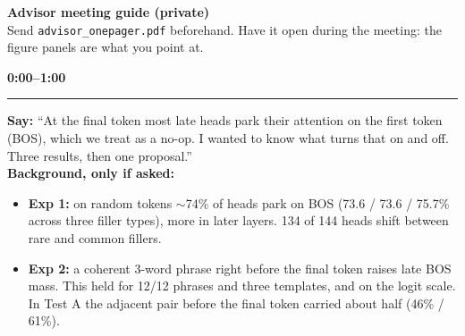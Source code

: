 \documentclass[10pt]{article}
\newcommand{\stage}[2]{\par\vspace{6pt}{\large\bfseries\color{cblue}#1}\hfill{\large\bfseries #2}\\[-4pt]\rule{\linewidth}{0.6pt}\par}
\newcommand{\lab}[1]{\textbf{\color{ink2}#1}}
\begin{document}
\small

{\Large\bfseries Advisor meeting guide (private)}\\
{\footnotesize\color{muted} Send \texttt{advisor\_onepager.pdf} beforehand. Have it open during the meeting: the figure panels  are what you point at.}

\vspace{4pt}

\stage{Framing}{0:00--1:00}
\lab{Say:} ``At the final token most late heads park their attention on the first token (BOS), which we treat as a no-op. I wanted to know what turns that on and off. Three results, then one proposal.''\\
\lab{Background, only if asked:}
\begin{itemize}
\item \textbf{Exp 1:} on random tokens $\sim$74\% of heads park on BOS (73.6 / 73.6 / 75.7\% across three filler types), more in later layers. 134 of 144 heads shift between rare and common fillers.
\item \textbf{Exp 2:} a coherent 3-word phrase right before the final token raises late BOS mass. This held for 12/12 phrases and three templates, and on the logit scale. In Test A the adjacent pair before the final token carried about half (46\% / 61\%).
\end{itemize}
\end{document}
